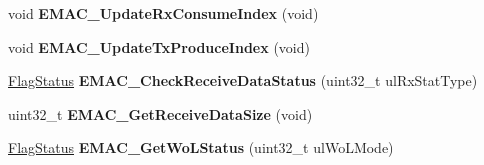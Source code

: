 \begin{DoxyCompactItemize}
\item 
\hypertarget{group___e_m_a_c___public___functions_gad22d992dd541c975eab6ef42625007b1}{void {\bfseries \-E\-M\-A\-C\-\_\-\-Update\-Rx\-Consume\-Index} (void)}\label{group___e_m_a_c___public___functions_gad22d992dd541c975eab6ef42625007b1}

\item 
\hypertarget{group___e_m_a_c___public___functions_gabe9a248525e20f3776979ff07d832ac8}{void {\bfseries \-E\-M\-A\-C\-\_\-\-Update\-Tx\-Produce\-Index} (void)}\label{group___e_m_a_c___public___functions_gabe9a248525e20f3776979ff07d832ac8}

\item 
\hypertarget{group___e_m_a_c___public___functions_ga8c71f79c208695c4647e3e77cae4e76d}{\hyperlink{group___l_p_c___types___public___types_ga89136caac2e14c55151f527ac02daaff}{\-Flag\-Status} {\bfseries \-E\-M\-A\-C\-\_\-\-Check\-Receive\-Data\-Status} (uint32\-\_\-t ul\-Rx\-Stat\-Type)}\label{group___e_m_a_c___public___functions_ga8c71f79c208695c4647e3e77cae4e76d}

\item 
\hypertarget{group___e_m_a_c___public___functions_ga71a1b28be526c2cbe4f5993a656f2fba}{uint32\-\_\-t {\bfseries \-E\-M\-A\-C\-\_\-\-Get\-Receive\-Data\-Size} (void)}\label{group___e_m_a_c___public___functions_ga71a1b28be526c2cbe4f5993a656f2fba}

\item 
\hypertarget{group___e_m_a_c___public___functions_ga34a8bca0e0b83ac18fce119535c102dc}{\hyperlink{group___l_p_c___types___public___types_ga89136caac2e14c55151f527ac02daaff}{\-Flag\-Status} {\bfseries \-E\-M\-A\-C\-\_\-\-Get\-Wo\-L\-Status} (uint32\-\_\-t ul\-Wo\-L\-Mode)}\label{group___e_m_a_c___public___functions_ga34a8bca0e0b83ac18fce119535c102dc}

\end{DoxyCompactItemize}
